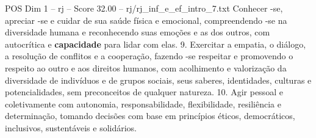 \begin{textsample}{POS Dim 1 – rj – Score 32.00 – rj/rj\_inf\_e\_ef\_intro\_7.txt}
Conhecer -se, apreciar -se e cuidar de sua saúde física e emocional, compreendendo -se na diversidade humana e reconhecendo suas emoções e as dos outros, com autocrítica e \textbf{capacidade} para lidar com elas. 9.
Exercitar a empatia, o diálogo, a resolução de conflitos e a cooperação, fazendo -se respeitar e promovendo o respeito ao outro e aos direitos humanos, com acolhimento e valorização da diversidade de indivíduos e de grupos sociais, seus saberes, identidades, culturas e potencialidades, sem preconceitos de qualquer natureza. 10.
Agir pessoal e coletivamente com autonomia, responsabilidade, flexibilidade, resiliência e determinação, tomando decisões com base em princípios éticos, democráticos, inclusivos, sustentáveis e solidários.

\end{textsample}
